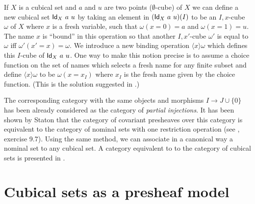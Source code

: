 \documentclass[10pt,a4paper]{article}
\newcommand{\Id}{{\sf Id}}
\newcommand{\set}[1]{\{#1\}}
\newcommand{\es}{\emptyset}
\newcommand{\bind}[2]{{\langle}#1{\rangle}#2}
\begin{document}
 If $X$ is a cubical set and $a$ and $u$ are two points ($\es$-cube) of $X$ we can define a new cubical set $\Id_X~a~u$
by taking an element in $(\Id_X~a~u)(I)$ to be an $I,x$-cube $\omega$ of $X$ where $x$ is
a fresh variable, such that $\omega(x=0) = a$ and $\omega(x=1) = u$. The name $x$ is ``bound''
in this operation so that another $I,x'$-cube $\omega'$ is equal to $\omega$
iff $\omega'(x'=x) = \omega$.
We introduce a new binding operation $\bind{x}{\omega}$ which defines this $I$-cube of $\Id_X~a~u$.
One way to make this notion precise is to assume a choice function
on the set of names which selects a fresh name for any finite subset and define $\bind{x}{\omega}$ to be $\omega (x=x_I)$ where
$x_I$ is the fresh name given by the choice function. (This is the solution suggested in \cite{Stoughton}.)

\medskip

 The corresponding category with the same objects and morphisms $I \to J\cup\{0\}$ has been already
considered as the category of {\em partial injections}. It has been shown by Staton that the category of covariant
presheaves over this category is equivalent to the category of nominal sets with one restriction operation
(see \cite{pitts}, exercise 9.7). Using the same method, we can associate in a canonical way a nominal set
to any cubical set. A category equivalent to to the category of cubical sets is presented in \cite{Pitts}.

\section{Cubical sets as a presheaf model}
\label{sec:presheaf-models}
\end{document}

